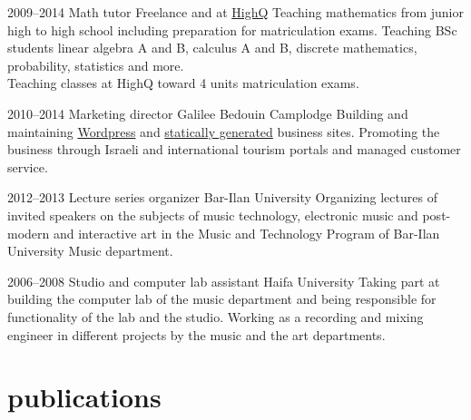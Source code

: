 \documentclass[]{friggeri-cv}  %
\begin{document}
\begin{entrylist}

    \entry
    {2009--2014}
    {Math tutor}
    {Freelance and at \href{http://high-q.co.il/}{HighQ}}
    {Teaching mathematics from junior high to high school including preparation for matriculation exams. Teaching BSc students linear algebra A and B, calculus A and B, discrete mathematics, probability, statistics and more.\\
    Teaching classes at HighQ toward 4 units matriculation exams.}

\end{entrylist}
\begin{entrylist}

    \entry
    {2010--2014}
    {Marketing director}
    {Galilee Bedouin Camplodge}
    {Building and maintaining \href{http://www.shevet-ahim.co.il/en/}{Wordpress} and \href{http://www.galilee-bedouin-camplodge.com}{statically generated} business sites.
    Promoting the business through Israeli and international tourism portals and managed customer service.}

\end{entrylist}
\begin{entrylist}

    \entry
    {2012--2013}
    {Lecture series organizer}
    {Bar-Ilan University}
    {Organizing lectures of invited speakers on the subjects of music technology, electronic music and post-modern and interactive art in the Music and Technology Program of Bar-Ilan University Music department.}

\end{entrylist}
\begin{entrylist}

    \entry
    {2006--2008}
    {Studio and computer lab assistant}
    {Haifa University}
    {Taking part at building the computer lab of the music department and being responsible for functionality of the lab and the studio. Working as a recording and mixing engineer in different projects by the music and the art departments.}

\end{entrylist}


\section{publications}
\end{document}
